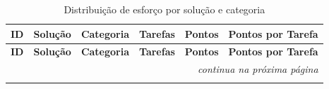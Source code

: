 	\begin{longtable}{cccccc}
		\label{tab:esforco_solucoes_historico} \\
		\toprule
		\textbf{ID} & \textbf{Solução} & \textbf{Categoria} & \textbf{Tarefas} & \textbf{Pontos} & \textbf{Pontos por Tarefa} \\
		\midrule
		\endfirsthead

		\toprule
		\textbf{ID} & \textbf{Solução} & \textbf{Categoria} & \textbf{Tarefas} & \textbf{Pontos} & \textbf{Pontos por Tarefa} \\
		\midrule
		\endhead

		\midrule
		\multicolumn{6}{r}{\textit{continua na próxima página}} \\
		\midrule
		\endfoot

		\bottomrule
		\caption{Distribuição de esforço por solução e categoria}
		\endlastfoot


\end{longtable}
